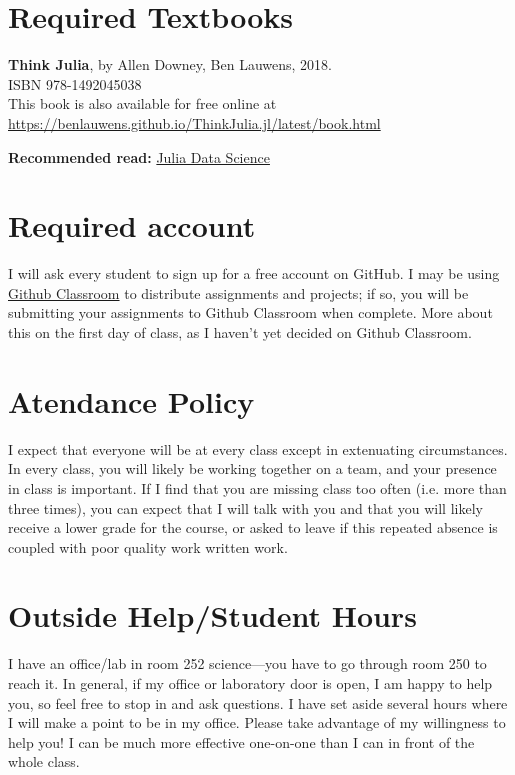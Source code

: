 \documentclass[justified]{tufte-handout}
\begin{document}
\section{Required Textbooks}

\textbf{Think Julia}, by Allen Downey, Ben Lauwens, 2018.\\
ISBN 978-1492045038\\
This book is also available for free online at\\
 \href{https://benlauwens.github.io/ThinkJulia.jl/latest/book.html}{https://benlauwens.github.io/ThinkJulia.jl/latest/book.html}
 
 \textbf{Recommended read:} \href{https://juliadatascience.io/}{Julia Data Science}\\
\section{Required account}
I will ask every student to sign up for a free account on GitHub. I may be using 
\href{http://classroom.github.com}{Github Classroom} to distribute assignments and projects; if so, you will be submitting your assignments to Github Classroom when complete. More about this on the first day of class, as I haven't yet decided on Github Classroom. 

\section{Atendance Policy}
I expect that everyone will be at every class except in extenuating circumstances. 
In every class, you will likely be working together on a team, and your presence in class
is important. If I find that you are missing class too often (i.e. more than three times), 
you can expect that I will talk with you and that you will likely receive a 
lower grade for the course, or asked to leave if this repeated absence is coupled 
with poor quality work written work. 

\section{Outside Help/Student Hours}
I have an office/lab in room 252 science---you have to go through room 250 to reach it. 
In general, if my office or laboratory door is open, I am happy to help you, so feel free to stop in
and ask questions. I have set aside several hours
where I will make a point to be in my office. Please take advantage of my
willingness to help you! I can be much more effective one-on-one than I can in
front of the whole class. 
\end{document}
